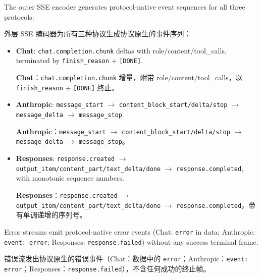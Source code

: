 The outer SSE encoder generates protocol-native event sequences for all three protocols:
\begin{chinese}
外层 SSE 编码器为所有三种协议生成协议原生的事件序列：
\end{chinese}
\begin{itemize}[nosep]
    \item \textbf{Chat}: \texttt{chat.completion.chunk} deltas with role/content/tool\_calls, terminated by \texttt{finish\_reason} + \texttt{[DONE]}.
    \begin{chinese}
    \textbf{Chat}：\texttt{chat.completion.chunk} 增量，附带 role/content/tool\_calls，以 \texttt{finish\_reason} + \texttt{[DONE]} 终止。
    \end{chinese}
    \item \textbf{Anthropic}: \texttt{message\_start} $\rightarrow$ \texttt{content\_block\_start/delta/stop} $\rightarrow$ \texttt{message\_delta} $\rightarrow$ \texttt{message\_stop}.
    \begin{chinese}
    \textbf{Anthropic}：\texttt{message\_start} $\rightarrow$ \texttt{content\_block\_start/delta/stop} $\rightarrow$ \texttt{message\_delta} $\rightarrow$ \texttt{message\_stop}。
    \end{chinese}
    \item \textbf{Responses}: \texttt{response.created} $\rightarrow$ \texttt{output\_item/content\_part/text\_delta/done} $\rightarrow$ \texttt{response.completed}, with monotonic sequence numbers.
    \begin{chinese}
    \textbf{Responses}：\texttt{response.created} $\rightarrow$ \texttt{output\_item/content\_part/text\_delta/done} $\rightarrow$ \texttt{response.completed}，带有单调递增的序列号。
    \end{chinese}
\end{itemize}

Error streams emit protocol-native error events (Chat: \texttt{error} in data; Anthropic: \texttt{event: error}; Responses: \texttt{response.failed}) without any success terminal frame.
\begin{chinese}
错误流发出协议原生的错误事件（Chat：数据中的 \texttt{error}；Anthropic：\texttt{event: error}；Responses：\texttt{response.failed}），不含任何成功的终止帧。
\end{chinese}
